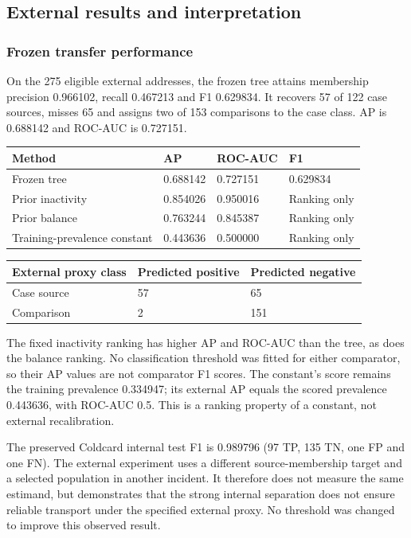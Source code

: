\begingroup
\setlength{\emergencystretch}{2em}
\subsection{External results and
interpretation}\label{external-results-and-interpretation}

\subsubsection{Frozen transfer
performance}\label{frozen-transfer-performance}

On the 275 eligible external addresses, the frozen tree attains
membership precision 0.966102, recall 0.467213 and F1 0.629834. It
recovers 57 of 122 case sources, misses 65 and assigns two of 153
comparisons to the case class. AP is 0.688142 and ROC-AUC is 0.727151.

\begin{longtable}[]{@{}llll@{}}
\toprule\noalign{}
Method & AP & ROC-AUC & F1 \\
\midrule\noalign{}
\endhead
\bottomrule\noalign{}
\endlastfoot
Frozen tree & 0.688142 & 0.727151 & 0.629834 \\
Prior inactivity & 0.854026 & 0.950016 & Ranking only \\
Prior balance & 0.763244 & 0.845387 & Ranking only \\
Training-prevalence constant & 0.443636 & 0.500000 & Ranking only \\
\end{longtable}

\begin{longtable}[]{@{}lll@{}}
\toprule\noalign{}
External proxy class & Predicted positive & Predicted negative \\
\midrule\noalign{}
\endhead
\bottomrule\noalign{}
\endlastfoot
Case source & 57 & 65 \\
Comparison & 2 & 151 \\
\end{longtable}

The fixed inactivity ranking has higher AP and ROC-AUC than the tree, as
does the balance ranking. No classification threshold was fitted for
either comparator, so their AP values are not comparator F1 scores. The
constant's score remains the training prevalence 0.334947; its external
AP equals the scored prevalence 0.443636, with ROC-AUC 0.5. This is a
ranking property of a constant, not external recalibration.

The preserved Coldcard internal test F1 is 0.989796 (97 TP, 135 TN, one
FP and one FN). The external experiment uses a different
source-membership target and a selected population in another incident.
It therefore does not measure the same estimand, but demonstrates that
the strong internal separation does not ensure reliable transport under
the specified external proxy. No threshold was changed to improve this
observed result.

